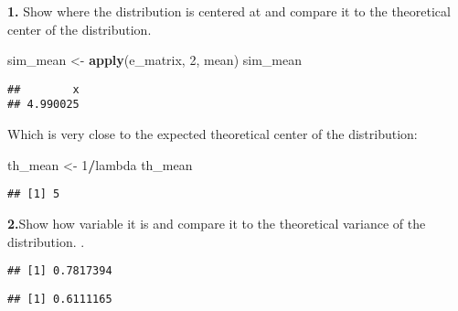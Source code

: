 \documentclass[]{article}
\newenvironment{Shaded}{\begin{snugshade}}{\end{snugshade}}
\newcommand{\KeywordTok}[1]{\textcolor[rgb]{0.13,0.29,0.53}{\textbf{#1}}}
\newcommand{\DecValTok}[1]{\textcolor[rgb]{0.00,0.00,0.81}{#1}}
\newcommand{\StringTok}[1]{\textcolor[rgb]{0.31,0.60,0.02}{#1}}
\newcommand{\OperatorTok}[1]{\textcolor[rgb]{0.81,0.36,0.00}{\textbf{#1}}}
\newcommand{\NormalTok}[1]{#1}
\begin{document}
\textbf{1.} Show where the distribution is centered at and compare it to
the theoretical center of the distribution.

\begin{Shaded}
\begin{Highlighting}[]
\NormalTok{sim_mean <-}\StringTok{ }\KeywordTok{apply}\NormalTok{(e_matrix, }\DecValTok{2}\NormalTok{, mean)}
\NormalTok{sim_mean}
\end{Highlighting}
\end{Shaded}

\begin{verbatim}
##        x 
## 4.990025
\end{verbatim}

Which is very close to the expected theoretical center of the
distribution:

\begin{Shaded}
\begin{Highlighting}[]
\NormalTok{th_mean <-}\StringTok{ }\DecValTok{1}\OperatorTok{/}\NormalTok{lambda}
\NormalTok{th_mean}
\end{Highlighting}
\end{Shaded}

\begin{verbatim}
## [1] 5
\end{verbatim}

\textbf{2.}Show how variable it is and compare it to the theoretical
variance of the distribution. .

\begin{Shaded}
\end{Shaded}

\begin{verbatim}
## [1] 0.7817394
\end{verbatim}

\begin{Shaded}
\end{Shaded}

\begin{verbatim}
## [1] 0.6111165
\end{verbatim}
\end{document}
